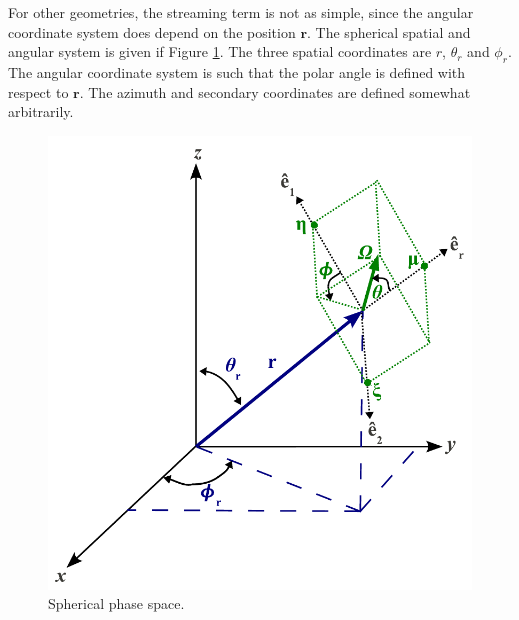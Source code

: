 For other geometries, the streaming term is not as simple, since the angular coordinate system does depend on the position $\mathbf{r}$.  The spherical spatial and angular system is given if Figure \ref{fig:spherical_phase_space}.  The three spatial coordinates are $r$, $\theta_r$ and $\phi_r$.  The angular coordinate system is such that the polar angle is defined with respect to $\mathbf{r}$.  The azimuth and secondary coordinates are defined somewhat arbitrarily.

\begin{figure}[ht] 
    \centering
    \includegraphics[keepaspectratio, width = 3.0 in]{images/spherical_phase_space}
    \caption{Spherical phase space.}
    \label{fig:spherical_phase_space}
\end{figure}

